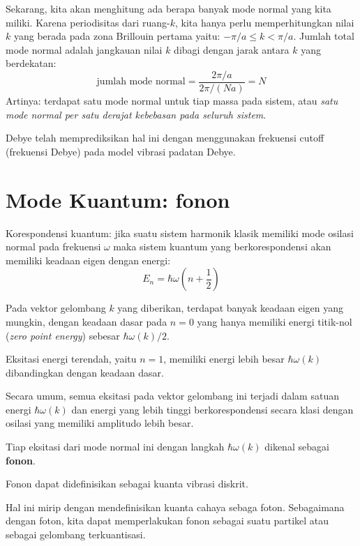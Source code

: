 Sekarang, kita akan menghitung ada berapa banyak mode normal yang kita
miliki. Karena periodisitas dari ruang-$k$, kita hanya perlu
memperhitungkan nilai $k$ yang berada pada zona Brillouin pertama
yaitu: $-\pi/a \leq k < \pi/a$.
Jumlah total mode normal adalah jangkauan nilai $k$ dibagi dengan
jarak antara $k$ yang berdekatan:
\begin{equation*}
\text{jumlah mode normal} = \frac{2\pi/a}{2\pi/(Na)} = N  
\end{equation*}
Artinya: terdapat satu mode normal untuk tiap massa pada sistem, atau
\emph{satu mode normal per satu derajat kebebasan pada seluruh sistem}.

Debye telah memprediksikan hal ini dengan menggunakan frekuensi cutoff
(frekuensi Debye) pada model vibrasi padatan Debye.



\section{Mode Kuantum: fonon}

Korespondensi kuantum: jika suatu sistem harmonik klasik memiliki mode
osilasi normal pada frekuensi $\omega$ maka sistem kuantum yang
berkorespondensi akan memiliki keadaan eigen dengan energi:
\begin{equation}
E_{n} = \hbar \omega \left( n + \frac{1}{2} \right)
\end{equation}

Pada vektor gelombang $k$ yang diberikan, terdapat banyak keadaan
eigen yang mungkin, dengan keadaan dasar pada $n=0$ yang hanya
memiliki energi titik-nol (\emph{zero point energy}) sebesar
$\hbar \omega(k)/2$.

Eksitasi energi terendah, yaitu $n=1$, memiliki energi lebih besar
$\hbar\omega(k)$ dibandingkan dengan keadaan dasar.

Secara umum, semua eksitasi pada vektor gelombang ini terjadi dalam
satuan energi $\hbar\omega(k)$ dan energi yang lebih tinggi
berkorespondensi secara klasi dengan osilasi yang memiliki amplitudo
lebih besar.

Tiap eksitasi dari mode normal ini dengan langkah $\hbar\omega(k)$
dikenal sebagai \textbf{fonon}.

Fonon dapat didefinisikan sebagai kuanta vibrasi diskrit.

Hal ini mirip dengan mendefinisikan kuanta cahaya sebaga foton.
Sebagaimana dengan foton, kita dapat memperlakukan fonon sebagai suatu
partikel atau sebagai gelombang terkuantisasi.

